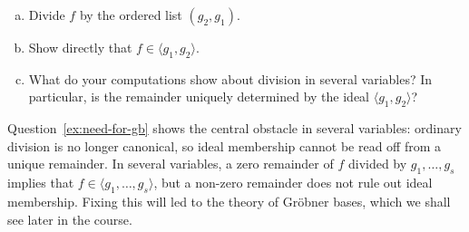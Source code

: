 \documentclass[12pt,reqno]{amsart}
\begin{document}
\begin{enumerate}[leftmargin=*]
\begin{enumerate}[(a)]
    \item Divide $f$ by the ordered list $(g_2,g_1)$.
    
    \item Show directly that $f\in \langle g_1,g_2\rangle$.
    
    \item What do your computations show about division in several variables? In particular, is the remainder uniquely determined by the ideal $\langle g_1,g_2\rangle$?
\end{enumerate}
\end{enumerate}

\hrulefill

Question~\ref{ex:need-for-gb} shows the central obstacle in several variables: ordinary division is no longer canonical, so ideal membership cannot be read off from a unique remainder. In several variables, a zero remainder of $f$ divided by $g_1,\ldots,g_s$ implies that $f \in \langle g_1,\ldots,g_s\rangle$, but a non-zero remainder does not rule out ideal membership. Fixing this will led to the theory of Gr\"obner bases, which we shall see later in the course. 

\hrulefill
\end{document}
